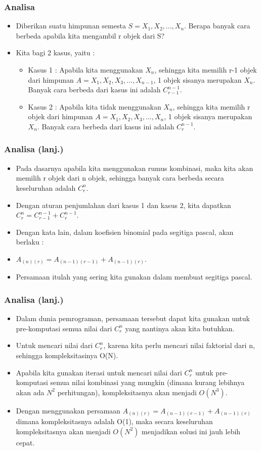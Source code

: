 \begin{frame}
\frametitle{Analisa}
\begin{itemize}
  \item Diberikan suatu himpunan semesta $S = {X_{1},X_{2},...,X_{n}}$. Berapa banyak cara berbeda apabila kita mengambil r objek dari S?
  \item Kita bagi 2 kasus, yaitu :
  \begin{itemize}
    \item Kasus 1 : Apabila kita menggunakan $X_{n}$, sehingga kita memilih r-1 objek dari himpunan $A = {X_{1},X_{2},X_{3},...,X_{n-1}}$, 1 objek sisanya merupakan $X_{n}$. Banyak cara berbeda dari kasus ini adalah $C^{n-1}_{r-1}$.
    \item Kasus 2 : Apabila kita tidak menggunakan $X_{n}$, sehingga kita memilih r objek dari himpunan $A = {X_{1},X_{2},X_{3},...,X_{n}}$, 1 objek sisanya merupakan $X_{n}$. Banyak cara berbeda dari kasus ini adalah $C^{n-1}_{r}$.
  \end{itemize}
\end{itemize}
\end{frame}

\begin{frame}
\frametitle{Analisa (lanj.)}
\begin{itemize}
  \item Pada dasarnya apabila kita menggunakan rumus kombinasi, maka kita akan memilih r objek dari n objek, sehingga banyak cara berbeda secara keseluruhan adalah $C^{n}_{r}$.
  \item Dengan aturan penjumlahan dari kasus 1 dan kasus 2, kita dapatkan $C^{n}_{r} = C^{n-1}_{r-1} + C^{n-1}_{r}$.
  \item Dengan kata lain, dalam koefisien binomial pada segitiga pascal, akan berlaku :
  \item $A_{(n)(r)} = A_{(n-1)(r-1)} + A_{(n-1)(r)}$.
  \item Persamaan itulah yang sering kita gunakan dalam membuat segitiga pascal.
\end{itemize}
\end{frame}

\begin{frame}
\frametitle{Analisa (lanj.)}
\begin{itemize}
  \item Dalam dunia pemrograman, persamaan tersebut dapat kita gunakan untuk pre-komputasi semua nilai dari $C^{n}_{r}$ yang nantinya akan kita butuhkan.
  \item Untuk mencari nilai dari $C^{n}_{r}$, karena kita perlu mencari nilai faktorial dari n, sehingga kompleksitasinya O(N).
  \item Apabila kita gunakan iterasi untuk mencari nilai dari $C^{n}_{r}$ untuk pre-komputasi semua nilai kombinasi yang mungkin (dimana kurang lebihnya akan ada $N^{2}$ perhitungan), kompleksitasnya akan menjadi $O(N^{3})$.
  \item Dengan menggunakan persamaan $A_{(n)(r)} = A_{(n-1)(r-1)} + A_{(n-1)(r)}$ dimana kompleksitasnya adalah O(1), maka secara keseluruhan kompleksitasnya akan menjadi $O(N^{2})$ menjadikan solusi ini jauh lebih cepat.
\end{itemize}
\end{frame}

